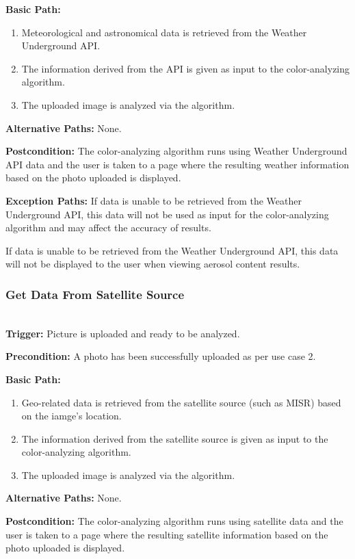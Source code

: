 \documentclass[letterpaper,10pt,draftclsnofoot,onecolumn]{IEEEtran}
\begin{document}
\begin{flushleft}
\textbf{Basic Path: }
\begin{enumerate}
	\item Meteorological and astronomical data is retrieved from the Weather Underground API.
	\item The information derived from the API is given as input to the color-analyzing algorithm.
	\item The uploaded image is analyzed via the algorithm.
\end{enumerate}

\textbf{Alternative Paths: }
None.

\textbf{Postcondition: }
The color-analyzing algorithm runs using Weather Underground API data and the user is taken to a page where the resulting weather information based on the photo uploaded is displayed.

\textbf{Exception Paths: }
If data is unable to be retrieved from the Weather Underground API, this data will not be used as input for the color-analyzing algorithm and may affect the accuracy of results.

If data is unable to be retrieved from the Weather Underground API, this data will not be displayed to the user when viewing aerosol content results.
\bigskip

\subsubsection{Get Data From Satellite Source} \ \\

\textbf{Trigger: }
Picture is uploaded and ready to be analyzed.

\textbf{Precondition: }
A photo has been successfully uploaded as per use case 2.

\textbf{Basic Path: }
\begin{enumerate}
	\item Geo-related data is retrieved from the satellite source (such as MISR) based on the iamge's location.
	\item The information derived from the satellite source is given as input to the color-analyzing algorithm.
	\item The uploaded image is analyzed via the algorithm.
\end{enumerate}

\textbf{Alternative Paths: } 
None.

\textbf{Postcondition: }
The color-analyzing algorithm runs using satellite data and the user is taken to a page where the resulting satellite information based on the photo uploaded is displayed.


\end{flushleft}
\end{document}
